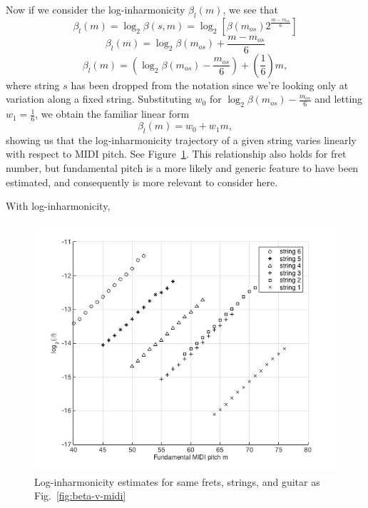 \documentclass[12pt]{cmuthesis}
\begin{document}
Now if we consider the log-inharmonicity $\beta_{l}(m)$, we see that
\begin{equation}
\beta_l(m) = \log_2\beta(s,m) = \log_2[\beta(m_{os})2^{\frac{m-m_{os}}{6}}]
\end{equation}
\begin{equation}
\beta_l(m) = \log_2\beta(m_{os}) + \frac{m-m_{os}}{6}
\end{equation}
\begin{equation}
\beta_l(m) = (\log_2\beta(m_{os})-\frac{m_{os}}{6}) + (\frac{1}{6})m,
\end{equation}
where string $s$ has been dropped from the notation since we're looking only at variation along a fixed string. Substituting $w_0$ for $\log_2\beta(m_{os})-\frac{m_{os}}{6}$ and letting $w_1 = \frac{1}{6}$, we obtain the familiar linear form
\begin{equation}
\label{eq:linear-traj}
\beta_l(m) = w_0 + w_1m,
\end{equation}
showing us that the log-inharmonicity trajectory of a given string varies linearly with respect to MIDI pitch. See Figure~\ref{fig:log-beta-v-midi}. This relationship also holds for fret number, but fundamental pitch is a more likely and generic feature to have been estimated, and consequently is more relevant to consider here.

With log-inharmonicity, 

\begin{figure}[!htbp] 
\label{fig:log-beta-v-midi}
\centering
\includegraphics[scale=0.7]{log-beta-v-midi}
\caption{Log-inharmonicity estimates for same frets, strings, and guitar as Fig.~\ref{fig:beta-v-midi}}
\end{figure}
\end{document}
